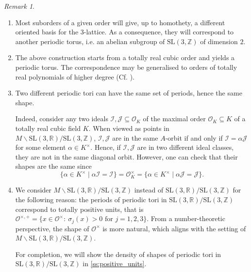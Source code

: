 \documentclass[11pt,letterpaper]{amsart}
\theoremstyle{definition}
\theoremstyle{remark}
\newtheorem{rem}[theorem]{Remark}
\renewcommand{\rm}[1]{\mathrm{#1}}
\newcommand{\cal}[1]{\mathcal{#1}}
\newcommand{\bb}[1]{\mathbb{#1}}
\newcommand{\R}{\bb R}
\newcommand{\Z}{\bb Z}
\newcommand{\calO}{\cal O}
\newcommand{\SL}{\rm{SL}}
\begin{document}
\begin{rem}\label{re:order positive}
\begin{enumerate}
\noindent
    \item Most suborders of a given order will give, up to homothety, a different oriented basis for the $3$-lattice.
    As a consequence, they will correspond to another periodic torus, i.e. an abelian subgroup of $\SL(3,\Z)$ of dimension $2$.
	
	\item The above construction starts from a totally real cubic order and yields a periodic torus. 
	The correspondence may be generalised to orders of totally real polynomials of higher degree 
	(Cf. \cite{einsiedler_distribution_2009}).

	\item Two different periodic tori can have the same set of periods, hence the same shape.

	{Indeed, consider any two ideals $\mathcal{I},\mathcal{J} \subseteq \mathcal{O}_K$ of the maximal order $\calO_K \subseteq K$ of a totally real cubic field $K$. When viewed as points in $M \backslash \SL(3,\R)/\SL(3,\Z)$, $\mathcal{I},\mathcal{J}$ are in the same $A$-orbit if and only if $\mathcal{I} = \alpha \mathcal{J}$ for some element $\alpha \in K^{\times}$. Hence, if $\mathcal{I},\mathcal{J}$ are in two different ideal classes, they are not in the same diagonal orbit. However, one can check that their shapes are the same since
	$$\{\alpha \in K^{\times} \mid \alpha \mathcal{I} = \mathcal{I}\} = \mathcal{O}_K^{\times} = \{\alpha \in K^{\times} \mid \alpha \mathcal{J} = \mathcal{J}\}.$$
	}
		
	\item 
	\label{reit:positive_units}
	We consider $M\backslash \SL(3,\R)/\SL (3,\Z)$ instead of $\SL(3,\R)/\SL (3,\Z)$ for the following reason: the periods of periodic tori in $\SL(3,\R)/\SL (3,\Z)$ correspond to totally positive units, that is $\calO^{\times,+}=\{x\in\calO^\times:\ \sigma_j(x)>0 \text{ for }j=1,2,3 \}$. From a number-theoretic perspective, the shape of $\calO^\times$ is more natural, which aligns with the setting of $M\backslash \SL(3,\R)/\SL (3,\Z) $.
	
	{For completion, we will show the density of shapes of periodic tori in $\SL(3,\R)/\SL(3,\Z)$ in \cref{ss:positive_units}.}
	
\end{enumerate}	
	\end{rem}
	
\end{document}
